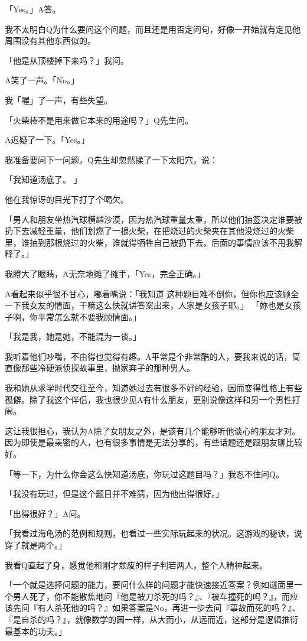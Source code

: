 \documentclass{article}
\begin{document}
「Yes。」A答。 

\newpage

我不太明白Q为什么要问这个问题，而且还是用否定问句，好像一开始就有定见他周围没有其他东西似的。 

「他是从顶楼掉下来吗？」我问。 

A笑了一声。「No。」 

我「喔」了一声，有些失望。 

「火柴棒不是用来做它本来的用途吗？」Q先生问。 

A迟疑了一下。「Yes。」 

我准备要问下一问题，Q先生却忽然揉了一下太阳穴，说： 

「我知道汤底了。 」 

他在我惊讶的目光下打了个喝欠。 

「男人和朋友坐热汽球横越沙漠，因为热汽球重量太重，所以他们抽签决定谁要被扔下去减轻重量，他们划燃了一根火柴，在把烧过的火柴夹在其他没烧过的火柴里，谁抽到那根烧过的火柴，谁就得牺牲自己被扔下去。后面的事情应该不用我解释了。」 

我瞪大了眼睛，A无奈地摊了摊手，「Yes，完全正确。」 

A看起来似乎很不甘心，嘟着嘴说：「我知道
\newpage
这种题目难不倒你，但你也应该顾全一下我女友的情面，干嘛这么快就讲答案出来，人家是女孩子耶。」
「妳也是女孩子啊，你平常怎么就不要我顾情面。」 

「我是我，她是她，不能混为一谈。」 

我听着他们吵嘴，不由得也觉得有趣。A平常是个非常酷的人，要我来说的话，简直像那些冷硬派侦探故事里，抛家弃子的那种男人。 

我和她从求学时代交往至今，知道她过去有很多不好的经验，因而变得性格上有些孤僻。除了我这个伴侣，我也很少见A有什么朋友，更别说像这样和另一个男性打闹。 

这让我很担心，我认为A除了女朋友之外，是该有几个能够听他谈心的朋友才对。因为即使是最亲密的人，也有很多事情是无法分享的，有些话题还是跟朋友聊比较好。 

「等一下，为什么你会这么快知道汤底，你玩过这题目吗？」我忍不住问Q。 

「我没有玩过，但是这个题目并不难猜，因为他出得很好。」 

「出得很好？」A问。 

\newpage

「我看过海龟汤的范例和规则，也看过一些实际玩起来的状况。这游戏的秘诀，说穿了就是两个。」 

我看Q直起了身，感觉他和刚才颓废的样子判若两人，整个人精神起来。 

「一个就是选择问题的能力，要问什么样的问题才能快速接近答案？例如谜面里一个男人死了，你不能散焦地问『他是被刀杀死的吗？』、『被车撞死的吗？』，而应该先问『有人杀死他的吗？』如果答案是No，再进一步去问『事故而死的吗？』、『是自杀的吗？』，就像数学的圆一样，从大而小，从远而近，这部分是逻辑推衍最基本的功夫。」 
\end{document}

